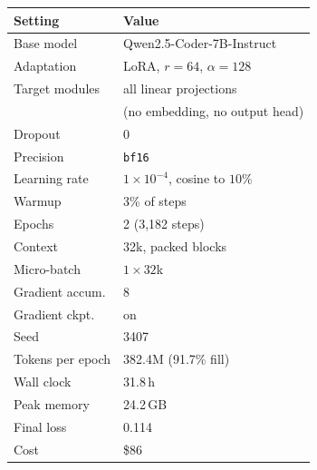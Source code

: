 \begin{tabular}{@{}ll@{}}
\toprule
Setting & Value \\
\midrule
Base model        & Qwen2.5-Coder-7B-Instruct \\
Adaptation        & LoRA, $r{=}64$, $\alpha{=}128$ \\
Target modules    & all linear projections \\
                  & (no embedding, no output head) \\
Dropout           & 0 \\
Precision         & \texttt{bf16} \\
\midrule
Learning rate     & $1{\times}10^{-4}$, cosine to $10\%$ \\
Warmup            & 3\% of steps \\
Epochs            & 2 (3,182 steps) \\
Context           & 32k, packed blocks \\
Micro-batch       & $1{\times}32$k \\
Gradient accum.   & 8 \\
Gradient ckpt.    & on \\
Seed              & 3407 \\
\midrule
Tokens per epoch  & 382.4M (91.7\% fill) \\
Wall clock        & 31.8\,h \\
Peak memory       & 24.2\,GB \\
Final loss        & 0.114 \\
Cost              & \$86 \\
\bottomrule
\end{tabular}
